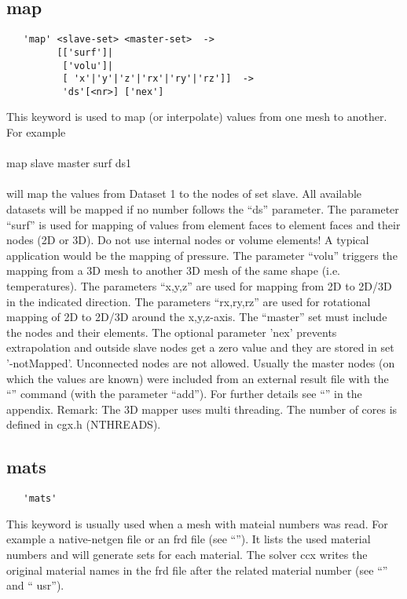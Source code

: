 \documentclass{article}
\begin{document}
\subsection{\label{map}map}
\begin{verbatim}
   'map' <slave-set> <master-set>  ->
         [['surf']|
          ['volu']|
          [ 'x'|'y'|'z'|'rx'|'ry'|'rz']]  ->
          'ds'[<nr>] ['nex']
\end{verbatim}
This keyword is used to map (or interpolate) values from one mesh to another. For example\\\\map slave master surf ds1\\\\will map the values from Dataset 1 to the nodes of set slave. All available datasets will be mapped if no number follows the ``ds'' parameter. The parameter ``surf'' is used for mapping of values from element faces to element faces and their nodes (2D or 3D). Do not use internal nodes or volume elements! A typical application would be the mapping of pressure. The parameter ``volu'' triggers the mapping from a 3D mesh to another 3D mesh of the same shape (i.e. temperatures). The parameters ``x,y,z'' are used for mapping from 2D to 2D/3D in the indicated direction. The parameters ``rx,ry,rz'' are used for rotational mapping of 2D to 2D/3D around the x,y,z-axis. The ``master'' set must include the nodes and their elements. The optional parameter 'nex' prevents extrapolation and outside slave nodes get a zero value and they are stored in set '-notMapped'. Unconnected nodes are not allowed. Usually the master nodes (on which the values are known) were included from an external result file with the ``'' command (with the parameter ``add''). For further details see ``'' in the appendix. Remark: The 3D mapper uses multi threading. The number of cores is defined in cgx.h (NTHREADS).

\subsection{\label{mats}mats}
\begin{verbatim}
   'mats' 
\end{verbatim}
This keyword is usually used when a mesh with mateial numbers was read. For example a native-netgen file \cite{NETGEN} or an frd file (see ``''). It lists the used material numbers and will generate sets for each material. The solver ccx writes the original material names in the frd file after the related material number (see ``'' and `` usr'').
\end{document}

